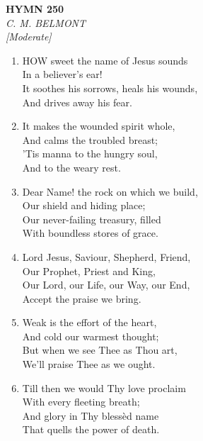 \documentclass[11pt,a4paper]{article}
\begin{document}
\newpage
\begin{center}
    {\Large \textbf{HYMN 250}}
    \\
    \textit{C. M. BELMONT}
    \\
    \textit{\small [Moderate]}
\end{center}
\vspace{1em}

\begin{enumerate}
    \item HOW sweet the name of Jesus sounds \\
            In a believer's ear! \\
        It soothes his sorrows, heals his wounds, \\
            And drives away his fear.

    \item It makes the wounded spirit whole, \\
            And calms the troubled breast; \\
        'Tis manna to the hungry soul, \\
            And to the weary rest.

    \item Dear Name! the rock on which we build, \\
            Our shield and hiding place; \\
        Our never-failing treasury, filled \\
            With boundless stores of grace.

    \item Lord Jesus, Saviour, Shepherd, Friend, \\
            Our Prophet, Priest and King, \\
        Our Lord, our Life, our Way, our End, \\
            Accept the praise we bring.

    \item Weak is the effort of the heart, \\
            And cold our warmest thought; \\
        But when we see Thee as Thou art, \\
            We'll praise Thee as we ought.

    \item Till then we would Thy love proclaim \\
            With every fleeting breath; \\
        And glory in Thy bless\`ed name \\
            That quells the power of death.

\end{enumerate}
\end{document}
